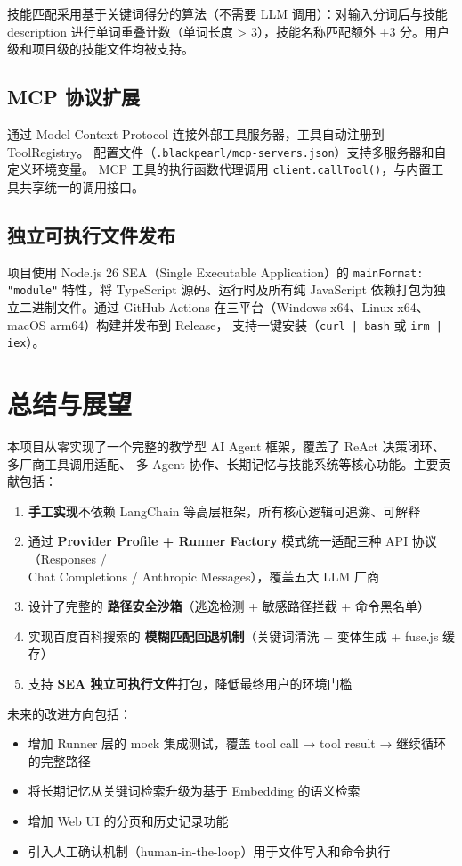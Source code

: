 \documentclass[12pt,a4paper]{ctexart}
\begin{document}
技能匹配采用基于关键词得分的算法（不需要 LLM 调用）：对输入分词后与技能 description
进行单词重叠计数（单词长度 > 3），技能名称匹配额外 +3 分。用户级和项目级的技能文件均被支持。

\subsection{MCP 协议扩展}

通过 Model Context Protocol 连接外部工具服务器，工具自动注册到 ToolRegistry。
配置文件（\texttt{.blackpearl/mcp-servers.json}）支持多服务器和自定义环境变量。
MCP 工具的执行函数代理调用 \texttt{client.callTool()}，与内置工具共享统一的调用接口。

\subsection{独立可执行文件发布}

项目使用 Node.js 26 SEA（Single Executable Application）的
\texttt{mainFormat: "module"}
特性，将 TypeScript 源码、运行时及所有纯 JavaScript 依赖打包为独立二进制文件。通过
GitHub Actions 在三平台（Windows x64、Linux x64、macOS arm64）构建并发布到 Release，
支持一键安装（\texttt{curl | bash} 或 \texttt{irm | iex}）。

\newpage
\section{总结与展望}

本项目从零实现了一个完整的教学型 AI Agent 框架，覆盖了 ReAct 决策闭环、多厂商工具调用适配、
多 Agent 协作、长期记忆与技能系统等核心功能。主要贡献包括：

\begin{enumerate}
  \item \textbf{手工实现}不依赖 LangChain 等高层框架，所有核心逻辑可追溯、可解释
  \item 通过 \textbf{Provider Profile + Runner Factory}
    模式统一适配三种 API 协议（Responses / \\
    Chat Completions / Anthropic Messages），覆盖五大 LLM 厂商
  \item 设计了完整的 \textbf{路径安全沙箱}（逃逸检测 + 敏感路径拦截 + 命令黑名单）
  \item 实现百度百科搜索的 \textbf{模糊匹配回退机制}（关键词清洗 + 变体生成 + fuse.js 缓存）
  \item 支持 \textbf{SEA 独立可执行文件}打包，降低最终用户的环境门槛
\end{enumerate}

未来的改进方向包括：
\begin{itemize}
  \item 增加 Runner 层的 mock 集成测试，覆盖 tool call → tool
    result → 继续循环的完整路径
  \item 将长期记忆从关键词检索升级为基于 Embedding 的语义检索
  \item 增加 Web UI 的分页和历史记录功能
  \item 引入人工确认机制（human-in-the-loop）用于文件写入和命令执行
\end{itemize}

    
\end{document}
